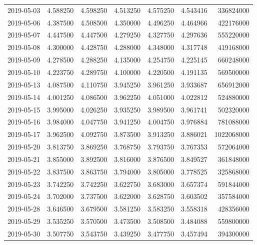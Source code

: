 \begin{tabular}{lrrrrrr}
2019-05-03 &    4.588250 &    4.598250 &    4.513250 &    4.575250 &    4.543416 &   336824000 \\
2019-05-06 &    4.387500 &    4.508500 &    4.350000 &    4.496250 &    4.464966 &   422176000 \\
2019-05-07 &    4.447500 &    4.447500 &    4.279250 &    4.327750 &    4.297636 &   555220000 \\
2019-05-08 &    4.300000 &    4.428750 &    4.288000 &    4.348000 &    4.317748 &   419168000 \\
2019-05-09 &    4.278500 &    4.288250 &    4.135000 &    4.254750 &    4.225145 &   660248000 \\
2019-05-10 &    4.223750 &    4.289750 &    4.100000 &    4.220500 &    4.191135 &   569500000 \\
2019-05-13 &    4.087500 &    4.110750 &    3.945250 &    3.961250 &    3.933687 &   656912000 \\
2019-05-14 &    4.001250 &    4.086500 &    3.962250 &    4.051000 &    4.022812 &   524880000 \\
2019-05-15 &    3.995000 &    4.026250 &    3.935250 &    3.989500 &    3.961741 &   502320000 \\
2019-05-16 &    3.984000 &    4.047750 &    3.941250 &    4.004750 &    3.976884 &   781088000 \\
2019-05-17 &    3.962500 &    4.092750 &    3.873500 &    3.913250 &    3.886021 &  1022068000 \\
2019-05-20 &    3.813750 &    3.869250 &    3.768750 &    3.793750 &    3.767353 &   572064000 \\
2019-05-21 &    3.855000 &    3.892500 &    3.816000 &    3.876500 &    3.849527 &   361848000 \\
2019-05-22 &    3.837500 &    3.863750 &    3.794000 &    3.805000 &    3.778525 &   325868000 \\
2019-05-23 &    3.742250 &    3.742250 &    3.622750 &    3.683000 &    3.657374 &   591844000 \\
2019-05-24 &    3.702000 &    3.737500 &    3.622000 &    3.628750 &    3.603502 &   357584000 \\
2019-05-28 &    3.646500 &    3.679500 &    3.581250 &    3.583250 &    3.558318 &   428356000 \\
2019-05-29 &    3.535250 &    3.570500 &    3.473500 &    3.508500 &    3.484088 &   559800000 \\
2019-05-30 &    3.507750 &    3.543750 &    3.439250 &    3.477750 &    3.457494 &   394300000 \\

\end{tabular}
